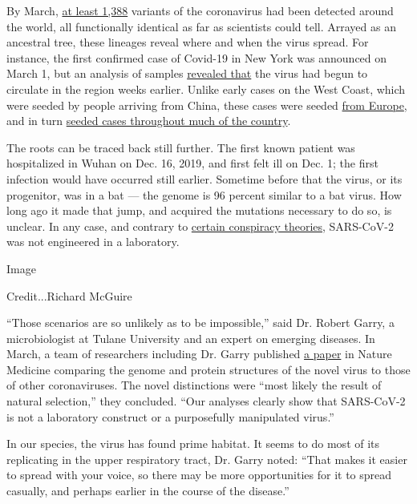 By March, \href{http://www.graphen.ai/covid.html}{at least 1,388}
variants of the coronavirus had been detected around the world, all
functionally identical as far as scientists could tell. Arrayed as an
ancestral tree, these lineages reveal where and when the virus spread.
For instance, the first confirmed case of Covid-19 in New York was
announced on March 1, but an analysis of samples
\href{https://www.nytimes3xbfgragh.onion/2020/04/08/science/new-york-coronavirus-cases-europe-genomes.htmlhttps://www.nytimes3xbfgragh.onion/2020/04/08/science/new-york-coronavirus-cases-europe-genomes.html}{revealed
that} the virus had begun to circulate in the region weeks earlier.
Unlike early cases on the West Coast, which were seeded by people
arriving from China, these cases were seeded
\href{https://nextstrain.org/narratives/ncov/sit-rep/2020-04-17?n=5}{from
Europe}, and in turn
\href{https://www.nytimes3xbfgragh.onion/2020/05/07/us/new-york-city-coronavirus-outbreak.html}{seeded
cases throughout much of the country}.

The roots can be traced back still further. The first known patient was
hospitalized in Wuhan on Dec. 16, 2019, and first felt ill on Dec. 1;
the first infection would have occurred still earlier. Sometime before
that the virus, or its progenitor, was in a bat --- the genome is 96
percent similar to a bat virus. How long ago it made that jump, and
acquired the mutations necessary to do so, is unclear. In any case, and
contrary to
\href{https://www.nytimes3xbfgragh.onion/2020/03/13/world/asia/coronavirus-china-conspiracy-theory.html}{certain
conspiracy theories}, SARS-CoV-2 was not engineered in a laboratory.

Image

Credit...Richard McGuire

``Those scenarios are so unlikely as to be impossible,'' said Dr. Robert
Garry, a microbiologist at Tulane University and an expert on emerging
diseases. In March, a team of researchers including Dr. Garry published
\href{https://www.nature.com/articles/S41591-020-0820-9}{a paper} in
Nature Medicine comparing the genome and protein structures of the novel
virus to those of other coronaviruses. The novel distinctions were
``most likely the result of natural selection,'' they concluded. ``Our
analyses clearly show that SARS-CoV-2 is not a laboratory construct or a
purposefully manipulated virus.''

In our species, the virus has found prime habitat. It seems to do most
of its replicating in the upper respiratory tract, Dr. Garry noted:
``That makes it easier to spread with your voice, so there may be more
opportunities for it to spread casually, and perhaps earlier in the
course of the disease.''

